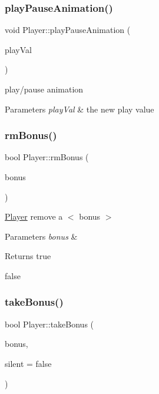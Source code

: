 \subsubsection{\texorpdfstring{play\+Pause\+Animation()}{playPauseAnimation()}}
{\footnotesize\ttfamily void Player\+::play\+Pause\+Animation (\begin{DoxyParamCaption}\item[{bool}]{play\+Val }\end{DoxyParamCaption})}



play/pause animation 


\begin{DoxyParams}{Parameters}
{\em play\+Val} & the new play value \\
\hline
\end{DoxyParams}
\mbox{\label{class_player_abf6efda3ab13411d806493e043c895bf}} 
\subsubsection{\texorpdfstring{rm\+Bonus()}{rmBonus()}}
{\footnotesize\ttfamily bool Player\+::rm\+Bonus (\begin{DoxyParamCaption}\item[{Bonus\+Type\+::\+Enum}]{bonus }\end{DoxyParamCaption})}



\hyperlink{class_player}{Player} remove a $<$ bonus $>$ 


\begin{DoxyParams}{Parameters}
{\em bonus} & \\
\hline
\end{DoxyParams}
\begin{DoxyReturn}{Returns}
true 

false 
\end{DoxyReturn}
\mbox{\label{class_player_a7d4df2ce6e2dafb5bfeb179462dc02cb}} 
\subsubsection{\texorpdfstring{take\+Bonus()}{takeBonus()}}
{\footnotesize\ttfamily bool Player\+::take\+Bonus (\begin{DoxyParamCaption}\item[{Bonus\+Type\+::\+Enum}]{bonus,  }\item[{bool}]{silent = {\ttfamily false} }\end{DoxyParamCaption})}



